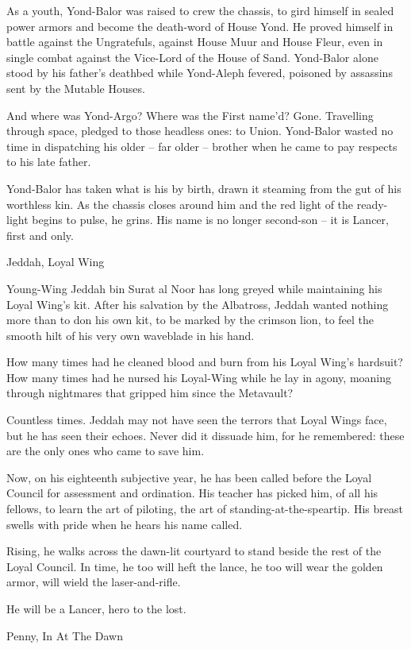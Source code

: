 As a youth, Yond-Balor was raised to crew the chassis, to gird himself in sealed power armors
and become the death-word of House Yond. He proved himself in battle against the Ungratefuls,
against House Muur and House Fleur, even in single combat against the Vice-Lord of the House
of Sand. Yond-Balor alone stood by his father’s deathbed while Yond-Aleph fevered, poisoned by
assassins sent by the Mutable Houses.

And where was Yond-Argo? Where was the First name’d? Gone. Travelling through space,
pledged to those headless ones: to Union. Yond-Balor wasted no time in dispatching his older --
far older -- brother when he came to pay respects to his late father.

Yond-Balor has taken what is his by birth, drawn it steaming from the gut of his worthless kin. As
the chassis closes around him and the red light of the ready-light begins to pulse, he grins. His
name is no longer second-son -- it is Lancer, first and only.

Jeddah, Loyal Wing

Young-Wing Jeddah bin Surat al Noor has long greyed while maintaining his Loyal Wing’s kit.
After his salvation by the Albatross, Jeddah wanted nothing more than to don his own kit, to be
marked by the crimson lion, to feel the smooth hilt of his very own waveblade in his hand.

How many times had he cleaned blood and burn from his Loyal Wing’s hardsuit? How many times
had he nursed his Loyal-Wing while he lay in agony, moaning through nightmares that gripped
him since the Metavault?

Countless times. Jeddah may not have seen the terrors that Loyal Wings face, but he has seen
their echoes. Never did it dissuade him, for he remembered: these are the only ones who came to
save him.

Now, on his eighteenth subjective year, he has been called before the Loyal Council for
assessment and ordination. His teacher has picked him, of all his fellows, to learn the art of
piloting, the art of standing-at-the-speartip. His breast swells with pride when he hears his name
called.

Rising, he walks across the dawn-lit courtyard to stand beside the rest of the Loyal Council. In
time, he too will heft the lance, he too will wear the golden armor, will wield the laser-and-rifle.

He will be a Lancer, hero to the lost.

Penny, In At The Dawn

